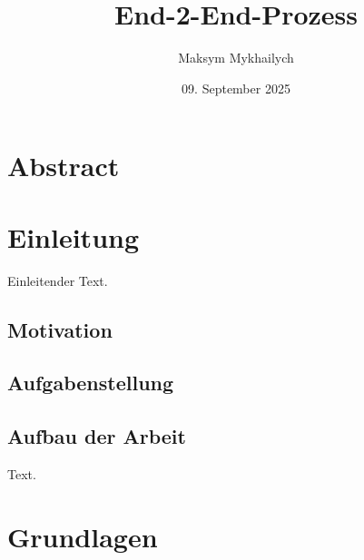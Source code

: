 \documentclass[a4paper, 12pt]{scrartcl}
\title{End-2-End-Prozess}
\author{Maksym Mykhailych}
\date{09. September 2025}
\begin{document}
	\maketitle
	\newpage
	\section*{Abstract}
	\newpage 	
	\tableofcontents
	\newpage
	
	\newpage
	\section{Einleitung}
	Einleitender Text.
	\newpage
	\subsection{Motivation}
	\subsection{Aufgabenstellung}
	\subsection{Aufbau der Arbeit}
	Text.
	\newpage
	\section{Grundlagen}
\end{document}
